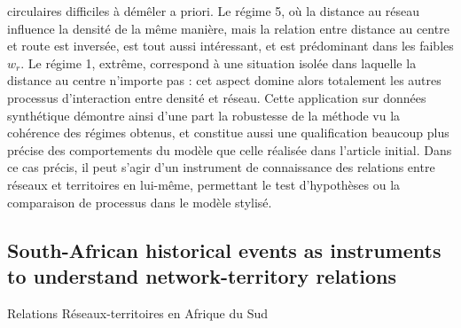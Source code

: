 circulaires difficiles à démêler a priori. Le régime 5, où la distance au réseau influence la densité de la même manière, mais la relation entre distance au centre et route est inversée, est tout aussi intéressant, et est prédominant dans les faibles $w_r$. Le régime 1, extrême, correspond à une situation isolée dans laquelle la distance au centre n'importe pas : cet aspect domine alors totalement les autres processus d'interaction entre densité et réseau. Cette application sur données synthétique démontre ainsi d'une part la robustesse de la méthode vu la cohérence des régimes obtenus, et constitue aussi une qualification beaucoup plus précise des comportements du modèle que celle réalisée dans l'article initial. Dans ce cas précis, il peut s'agir d'un instrument de connaissance des relations entre réseaux et territoires en lui-même, permettant le test d'hypothèses ou la comparaison de processus dans le modèle stylisé.





























\subsection[South-African historical events as instruments][]{South-African historical events as instruments to understand network-territory relations}{Relations Réseaux-territoires en Afrique du Sud}


